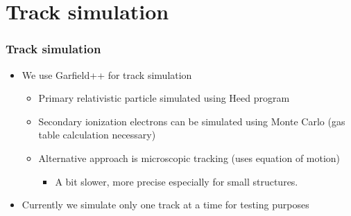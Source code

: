 \documentclass{beamer}
\begin{document}
	\section{Track simulation}
	\begin{frame}
		\frametitle{Track simulation}
		\begin{itemize}
			\item We use Garfield++ for track simulation
			\begin{itemize}
				\item Primary relativistic particle simulated using Heed program~\cite{heed}
				\item Secondary ionization electrons can be simulated using Monte Carlo (gas table calculation necessary)
				\item Alternative approach is microscopic tracking (uses equation of motion)
				\begin{itemize}\item A bit slower, more precise especially for small structures.  \end{itemize}
			\end{itemize}
			\item Currently we simulate only one track at a time for testing purposes
		\end{itemize}
	\end{frame}
	
\end{document}
